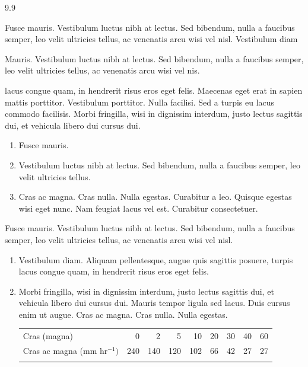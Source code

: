 \begin{problemlist}{9.9}
\item \label{ch01:prob3.1} Fusce mauris. Vestibulum luctus nibh at lectus. Sed bibendum, nulla a faucibus semper, leo velit
ultricies tellus, ac venenatis arcu wisi vel nisl. Vestibulum diam


\item \label{ch01:prob3.2} Mauris. Vestibulum luctus nibh at lectus. Sed bibendum, nulla a faucibus semper, leo velit
ultricies tellus, ac venenatis arcu wisi vel nis.

\item \label{ch01:prob3.3} lacus congue quam, in hendrerit risus eros eget felis. Maecenas eget erat in
sapien mattis porttitor. Vestibulum porttitor. Nulla facilisi. Sed a turpis eu lacus commodo facilisis.
Morbi fringilla, wisi in dignissim interdum, justo lectus sagittis dui, et vehicula libero dui cursus
dui.
\begin{enumerate}[(3)]
\item[(1)] Fusce mauris.

\item[(2)] Vestibulum luctus nibh at lectus. Sed bibendum, nulla a faucibus semper,
leo velit ultricies tellus.

\item[(3)] Cras ac magna. Cras nulla. Nulla egestas. Curabitur a leo. Quisque egestas
wisi eget nunc. Nam feugiat lacus vel est. Curabitur consectetuer.
\end{enumerate}

\item\label{ch01:prob3.15} Fusce mauris. Vestibulum luctus nibh at lectus. Sed bibendum, nulla a faucibus semper,
leo velit ultricies tellus, ac venenatis arcu wisi vel nisl.
\begin{enumerate}[(2)]
\item[(1)] Vestibulum diam. Aliquam pellentesque,
augue quis sagittis posuere, turpis lacus congue quam, in hendrerit risus eros eget
felis.

\item[(2)] Morbi fringilla, wisi in dignissim interdum, justo lectus
sagittis dui, et vehicula libero dui cursus dui. Mauris tempor ligula sed lacus. Duis cursus
enim ut augue. Cras ac magna. Cras nulla. Nulla egestas.

\bigskip

\begin{unnumtable} [!h]
\processtable{}
{\hspace*{-28pt}\begin{tabular}{@{}lrrrrrrrr}
\dtoprule Cras (magna)& 0& 2& 5& 10& 20& 30& 40&60 \\[3pt]
Cras ac magna (mm hr$^{-1})$& 240& 140& 120& 102&
66&42& 27&27 \\
\dbottomrule
\end{tabular}}{}
\end{unnumtable}
\end{enumerate}



\end{problemlist}

